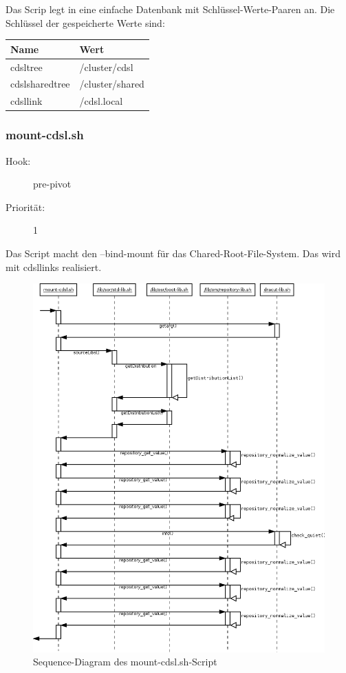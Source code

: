 \documentclass[10pt,a4paper]{article}
\begin{document}
Das Scrip legt in eine einfache Datenbank mit Schlüssel-Werte-Paaren an. Die Schlüssel der gespeicherte Werte sind:

\medskip 

\begin{tabular}{|l|l|}
 \hline
\textbf{Name} & \textbf{ Wert} \\ \hline
cdsltree & /cluster/cdsl \\ \hline
cdslsharedtree & /cluster/shared \\ \hline
cdsllink & /cdsl.local \\ \hline
\end{tabular} 

\subsubsection{mount-cdsl.sh}
\begin{description}
\item[Hook:] pre-pivot
\item[Priorität:] 1
\end{description}

Das Script macht den --bind-mount für das Chared-Root-File-System. Das wird mit cdsllinks realisiert.

\begin{figure}[H]
 \centering
 \includegraphics[width=1.0\textwidth,height=1.0\textwidth]{./sequence_diagram_mount-cdsl_DE_de.png}
 \caption[]{Sequence-Diagram des mount-cdsl.sh-Script}
\end{figure}
\end{document}
